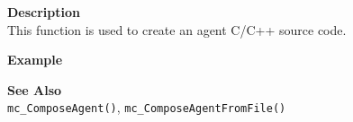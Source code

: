 \noindent
{\bf Description}\\
This function is used to create an agent C/C++ source code. 

\noindent
{\bf Example}\\
\noindent
{\footnotesize}

\noindent
{\bf See Also}\\
\texttt{mc\_ComposeAgent()}, \texttt{mc\_ComposeAgentFromFile()}

